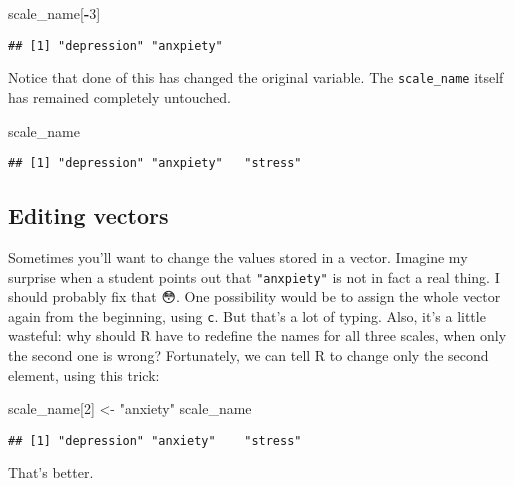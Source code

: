 \documentclass[]{book}
\newenvironment{Shaded}{\begin{snugshade}}{\end{snugshade}}
\newcommand{\DecValTok}[1]{\textcolor[rgb]{0.00,0.00,0.81}{#1}}
\newcommand{\NormalTok}[1]{#1}
\newcommand{\OperatorTok}[1]{\textcolor[rgb]{0.81,0.36,0.00}{\textbf{#1}}}
\newcommand{\StringTok}[1]{\textcolor[rgb]{0.31,0.60,0.02}{#1}}
\begin{document}
\begin{Shaded}
\begin{Highlighting}[]
\NormalTok{scale_name[}\OperatorTok{-}\DecValTok{3}\NormalTok{]}
\end{Highlighting}
\end{Shaded}

\begin{verbatim}
## [1] "depression" "anxpiety"
\end{verbatim}

Notice that done of this has changed the original variable. The \texttt{scale\_name} itself has remained completely untouched.

\begin{Shaded}
\begin{Highlighting}[]
\NormalTok{scale_name}
\end{Highlighting}
\end{Shaded}

\begin{verbatim}
## [1] "depression" "anxpiety"   "stress"
\end{verbatim}

\hypertarget{editing-vectors}{%
\subsection{Editing vectors}\label{editing-vectors}}

Sometimes you'll want to change the values stored in a vector. Imagine my surprise when a student points out that \texttt{"anxpiety"} is not in fact a real thing. I should probably fix that 😳. One possibility would be to assign the whole vector again from the beginning, using \texttt{c}. But that's a lot of typing. Also, it's a little wasteful: why should R have to redefine the names for all three scales, when only the second one is wrong? Fortunately, we can tell R to change only the second element, using this trick:

\begin{Shaded}
\begin{Highlighting}[]
\NormalTok{scale_name[}\DecValTok{2}\NormalTok{] <-}\StringTok{ "anxiety"}
\NormalTok{scale_name}
\end{Highlighting}
\end{Shaded}

\begin{verbatim}
## [1] "depression" "anxiety"    "stress"
\end{verbatim}

That's better.
\end{document}

